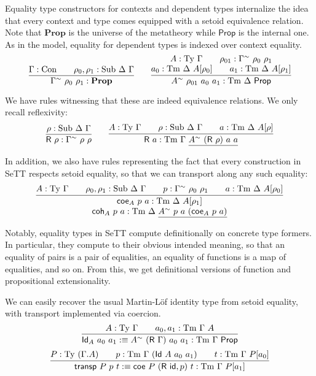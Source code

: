 \documentclass[a4paper,UKenglish,cleveref, autoref, thm-restate]{lipics-v2019}
\newcommand{\GG}{\Gamma}
\newcommand{\DD}{\Delta}
\newcommand{\GD}{\Delta}
\newcommand{\R}{\textsf{R}}
\newcommand{\Id}{\textsf{Id}}
\newcommand{\coe}{\textsf{coe}}
\newcommand{\coh}{\textsf{coh}}
\newcommand{\tyj}[2]{#2 : \Ty\ #1}
\newcommand{\tmj}[3]{#2 : \Tm\ #1\ #3}
\newcommand{\subj}[3]{#1 : \mathrm{Sub}\ #2\ #3}
\newcommand{\Prop}{\textsf{Prop}}
\newcommand{\mProp}{\mathbf{Prop}}
\newcommand{\Con}{\mathrm{Con}}
\newcommand{\Ty}{\mathrm{Ty}}
\newcommand{\Tm}{\mathrm{Tm}}
\newcommand{\Sub}{\mathrm{Sub}}
\begin{document}
Equality type constructors for contexts and dependent types internalize the idea
that every context and type comes equipped with a setoid equivalence
relation. Note that $\mProp$ is the universe of the metatheory while $\Prop$ is
the internal one. As in the model, equality for dependent types is indexed over context
equality.
\[
\infer{
  \GG^\sim\ \rho_0\ \rho_1 : \mProp
}{
  \GG : \Con \qquad \subj{\rho_0, \rho_1}{\DD}{\GG}
}
\qquad
\infer{
  A^{\sim}\ \rho_{01}\ a_0\ a_1 : \Tm\ \DD\ \Prop
}{
  \deduce{
    a_0 : \Tm\ \DD\ A[\rho_0] \qquad a_1 : \Tm\ \DD\ A[\rho_1]
  }{
    A : \Ty\ \GG \qquad \rho_{01} : \GG^{\sim}\ \rho_0\ \rho_1
  }
}
\]

We have rules witnessing that these are indeed equivalence relations. We only
recall reflexivity:
\[
\infer{
  \textsf{R}\ \rho : \GG^\sim\ \rho\ \rho
}{
  \rho : \Sub\ \GD\ \GG
}
\qquad
\infer{
  \textsf{R}\ a : \Tm\ \GG\ \underline{A^\sim\ (\textsf{R}\ \rho)\ a\ a}
}{
  A : \Ty\ \GG
  \qquad
  \rho : \Sub\ \GD\ \GG
  \qquad
  a : \Tm\ \GD\ A[\rho]
}
\]

In addition, we also have rules representing the fact that every construction in
SeTT respects setoid equality, so that we can transport along any such equality:
    \[
    \infer{
      \deduce{
        \tmj{\GD}{\coh_A\ p\ a}{\underline{A^\sim\ p\ a\ (\coe_A\ p\ a)}}
      }{
        \tmj{\GD}{\coe_A\ p\ a}{A[\rho_1]}
      }
    }{
      \tyj{\GG}{A} \qquad \subj{\rho_0, \rho_1}{\GD}{\GG} \qquad
      p : \GG^\sim\ \rho_0\ \rho_1\qquad
      \tmj{\GD}{a}{A[\rho_0]}
    }
    \]

Notably, equality types in SeTT compute definitionally on concrete type
formers. In particular, they compute to their obvious intended meaning, so that
an equality of pairs is a pair of equalities, an equality of functions is a map
of equalities, and so on. From this, we get definitional versions of function
and propositional extensionality.

We can easily recover the usual Martin-L\"of identity type from setoid equality,
with transport implemented via coercion.
\[
\infer{
  \textsf{Id}_A\ a_0\ a_1 :\equiv A^{\sim}\ (\R\ \GG)\ a_0\ a_1 : \Tm\ \GG\ \Prop
}{
  \tyj{\GG}{A} \qquad \tmj{\GG}{a_0, a_1}{A}
}
\]
\[
\infer{
  \textsf{transp}\ P\ p\ t :\equiv
    \coe\ P\ (\textsf{R}\ \textsf{id} , p)\ t : \Tm\ \GG\ P[a_1]
}{
  P : \Ty\ (\GG . A)
  \qquad
  p : \Tm\ \GG\ (\Id\ A\ a_0\ a_1)
  \qquad
  t : \Tm\ \GG\ P[a_0]
}
\]
\end{document}
